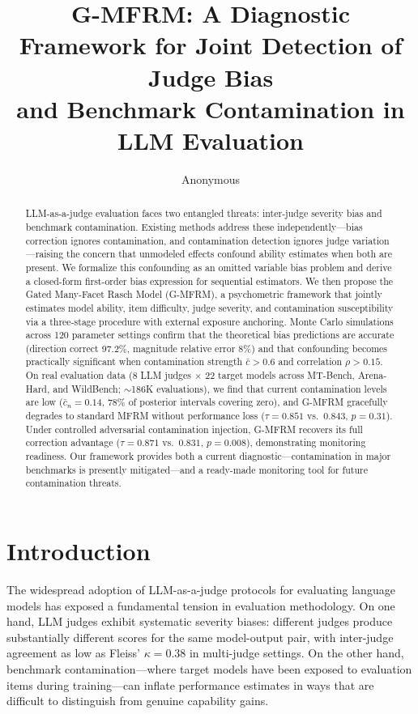 \documentclass[11pt]{article}
\title{G-MFRM: A Diagnostic Framework for Joint Detection of Judge Bias\\and Benchmark Contamination in LLM Evaluation}
\author{Anonymous}
\begin{document}
\maketitle

\begin{abstract}
LLM-as-a-judge evaluation faces two entangled threats: inter-judge severity bias and benchmark contamination.
Existing methods address these independently---bias correction ignores contamination, and contamination detection ignores judge variation---raising the concern that unmodeled effects confound ability estimates when both are present.
We formalize this confounding as an omitted variable bias problem and derive a closed-form first-order bias expression for sequential estimators.
We then propose the Gated Many-Facet Rasch Model (G-MFRM), a psychometric framework that jointly estimates model ability, item difficulty, judge severity, and contamination susceptibility via a three-stage procedure with external exposure anchoring.
Monte Carlo simulations across 120 parameter settings confirm that the theoretical bias predictions are accurate (direction correct 97.2\%, magnitude relative error 8\%) and that confounding becomes practically significant when contamination strength $\bar{c} > 0.6$ and correlation $\rho > 0.15$.
On real evaluation data (8 LLM judges $\times$ 22 target models across MT-Bench, Arena-Hard, and WildBench; ${\sim}$186K evaluations), we find that current contamination levels are low ($\bar{c}_n = 0.14$, 78\% of posterior intervals covering zero), and G-MFRM gracefully degrades to standard MFRM without performance loss ($\tau = 0.851$ vs.\ $0.843$, $p = 0.31$).
Under controlled adversarial contamination injection, G-MFRM recovers its full correction advantage ($\tau = 0.871$ vs.\ $0.831$, $p = 0.008$), demonstrating monitoring readiness.
Our framework provides both a current diagnostic---contamination in major benchmarks is presently mitigated---and a ready-made monitoring tool for future contamination threats.
\end{abstract}

\section{Introduction}
\label{sec:intro}

The widespread adoption of LLM-as-a-judge protocols for evaluating language models \cite{zheng2024judging} has exposed a fundamental tension in evaluation methodology. On one hand, LLM judges exhibit systematic severity biases: different judges produce substantially different scores for the same model-output pair, with inter-judge agreement as low as Fleiss' $\kappa = 0.38$ in multi-judge settings. On the other hand, benchmark contamination---where target models have been exposed to evaluation items during training---can inflate performance estimates in ways that are difficult to distinguish from genuine capability gains.
\end{document}

